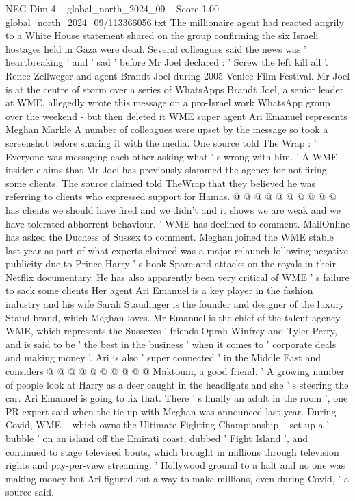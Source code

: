 \begin{textsample}{NEG Dim 4 – global\_north\_2024\_09 – Score 1.00 – global\_north\_2024\_09/113366056.txt}  \label{ex:f4_neg_142}
The millionaire agent had reacted angrily to a White House statement shared on the group confirming the six Israeli hostages held in Gaza were dead.
Several colleagues said the news was ' heartbreaking ' and ' sad ' before Mr Joel declared : ' Screw the left kill all '.
Renee Zellweger and agent Brandt Joel during 2005 Venice Film Festival.
Mr Joel is at the centre of storm over a series of WhatsApps Brandt Joel, a senior leader at WME, allegedly wrote this message on a pro-Israel work WhatsApp group over the weekend - but then deleted it WME super agent Ari Emanuel represents Meghan Markle A number of colleagues were upset by the message so took a screenshot before sharing it with the media.
One source told The Wrap : ' Everyone was messaging each other asking what ' s wrong with him. ' A WME insider claims that Mr Joel has previously slammed the agency for not firing some clients.
The source claimed told TheWrap that they believed he was referring to clients who expressed support for Hamas. @ @ @ @ @ @ @ @ @ @ has clients we should have fired and we didn't and it shows we are weak and we have tolerated abhorrent behaviour. ' WME has declined to comment.
MailOnline has asked the Duchess of Sussex to comment.
Meghan joined the WME stable last year as part of what experts claimed was a major relaunch following negative publicity due to Prince Harry ' s book Spare and attacks on the royals in their Netflix documentary.
He has also apparently been very critical of WME ' s failure to sack some clients Her agent Ari Emanuel is a key player in the fashion industry and his wife Sarah Staudinger is the founder and designer of the luxury Staud brand, which Meghan loves.
Mr Emanuel is the chief of the talent agency WME, which represents the Sussexes ' friends Oprah Winfrey and Tyler Perry, and is said to be ' the best in the business ' when it comes to ' corporate deals and making money '.
Ari is also ' super connected ' in the Middle East and considers @ @ @ @ @ @ @ @ @ @ Maktoum, a good friend. ' A growing number of people look at Harry as a deer caught in the headlights and she ' s steering the car.
Ari Emanuel is going to fix that.
There ' s finally an adult in the room ', one PR expert said when the tie-up with Meghan was announced last year.
During Covid, WME -- which owns the Ultimate Fighting Championship -- set up a ' bubble ' on an island off the Emirati coast, dubbed ' Fight Island ', and continued to stage televised bouts, which brought in millions through television rights and pay-per-view streaming. ' Hollywood ground to a halt and no one was making money but Ari figured out a way to make millions, even during Covid, ' a source said.

\end{textsample}
